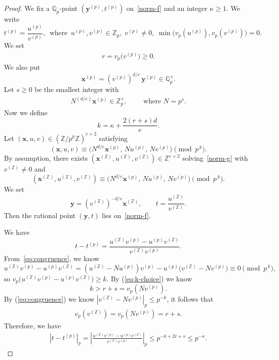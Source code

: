 \documentclass[10pt,a4paper]{amsart}
\newcommand{\QQ}{\mathbb{Q}}
\newcommand{\ZZ}{\mathbb{Z}}
\newcommand{\xx}{\mathbf{x}}
\newcommand{\yy}{\mathbf{y}}
\renewcommand{\ge}{\geqslant}
\renewcommand{\le}{\leqslant}
\begin{document}
\begin{proof}
We fix a $\QQ_p$-point $(\yy^{(p)},t^{(p)})$ on~\eqref{norm-f} and an integer $\kappa\ge 1$. We write  
\[
t^{(p)}=\frac{u^{(p)}}{v^{(p)}},  \,\text{ where } \,
u^{(p)},v^{(p)}\in\ZZ_p,\;
v^{(p)}\neq 0,\;
\min\bigl(v_p(u^{(p)}),v_p(v^{(p)})\bigr)=0.
\]
We set
\begin{align}\label{vpp}
	r=v_p\!\bigl(v^{(p)}\bigr)\ge 0.
\end{align}
We also put  
\[
\xx^{(p)}=(v^{(p)})^{d/e}\,\yy^{(p)}\in\QQ_p^{\,e}.
\]
Let $s\ge 0$ be the smallest integer with  
\begin{align}\label{def-s}
	N^{(d/e)}\xx^{(p)}\in\ZZ_p^{\,e},\qquad \text{ where } N = p^s.
\end{align}
Now we define  
\begin{equation}\label{eq:k-choice}
k=\kappa + \frac{2(r+s)d}{e}.
\end{equation}
Let $(\xx, u, v) \in (\ZZ / p^k \ZZ)^{e+2}$ satisfying
\[
(\xx,u,v)\equiv\bigl(N^{d/e}\xx^{(p)},\,Nu^{(p)},\,Nv^{(p)}\bigr)\pmod{p^{\,k}}.
\]
By assumption, there exists $(\xx^{(\ZZ)},u^{(\ZZ)},v^{(\ZZ)})\in\ZZ^{e+2}$ solving~\eqref{norm-g} with $v^{(\ZZ)} \neq 0$ and  
\begin{equation}\label{eq:congruence}
(\xx^{(\ZZ)},u^{(\ZZ)},v^{(\ZZ)})\equiv\bigl(N^{d/e}\xx^{(p)},\,Nu^{(p)},\,Nv^{(p)}\bigr)\pmod{p^{\,k}}.
\end{equation}
We set  
\[
\yy=(v^{(\ZZ)})^{-d/e}\xx^{(\ZZ)},\qquad t=\frac{u^{(\ZZ)}}{v^{(\ZZ)}}.
\]
Then the rational point $(\yy,t)$ lies on~\eqref{norm-f}.

We have
$$t-t^{(p)}
 = \frac{u^{(\ZZ)}v^{(p)}-u^{(p)}v^{(\ZZ)}}{v^{(\ZZ)}v^{(p)}}.$$
From~\eqref{eq:congruence}, we know
\[
u^{(\ZZ)}v^{(p)}-u^{(p)}v^{(\ZZ)}
 =(u^{(\ZZ)}-Nu^{(p)})v^{(p)}-u^{(p)}\bigl(v^{(\ZZ)} - Nv^{(p)}\bigr)\equiv 0\pmod{p^{\,k}},
\]
so $v_p\bigl(u^{(\ZZ)}v^{(p)}-u^{(p)}v^{(\ZZ)}\bigr)\ge k$.
By (\ref{eq:k-choice}) we know 
$$k > r + s = v_p(Nv^{(p)}).$$ 
By (\ref{eq:congruence}) we know $|v^{(\ZZ)} - Nv^{(p)}|_p \le p^{-k}$, it follows that 
\begin{align}\label{vpz}
	v_p(v^{(\ZZ)}) = v_p(N v^{(p)}) =  r+s.
\end{align}
Therefore, we have  
\begin{align}\label{p-t}
	|t-t^{(p)}|_p
 =\left|\frac{u^{(\ZZ)}v^{(p)}-u^{(p)}v^{(\ZZ)}}{v^{(\ZZ)}v^{(p)}}\right|_p
 \le p^{-k+2r+s}\le p^{-\kappa}.
\end{align}


\end{proof}
\end{document}

